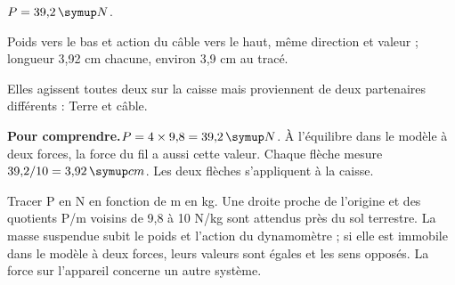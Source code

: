 \par\noindent\begin{minipage}{\linewidth}
\label{cor-defi-9}\begin{questions}
\item $P=39{,}2\unite N$.
\item Poids vers le bas et action du câble vers le haut, même direction et valeur ; longueur 3,92 cm chacune, environ 3,9 cm au tracé.
\item Elles agissent toutes deux sur la caisse mais proviennent de deux partenaires différents : Terre et câble.
\end{questions}
\par\smallskip\noindent\textbf{Pour comprendre.}\enspace $P=4\times9{,}8=39{,}2\unite N$. À l’équilibre dans le modèle à deux forces, la force du fil a aussi cette valeur. Chaque flèche mesure $39{,}2/10=3{,}92\unite{cm}$. Les deux flèches s’appliquent à la caisse.\par
{}
\end{minipage}
\par\noindent\begin{minipage}{\linewidth}
\label{cor-activite-9}
Tracer P en N en fonction de m en kg. Une droite proche de l’origine et des quotients P/m voisins de 9,8 à 10 N/kg sont attendus près du sol terrestre. La masse suspendue subit le poids et l’action du dynamomètre ; si elle est immobile dans le modèle à deux forces, leurs valeurs sont égales et les sens opposés. La force sur l’appareil concerne un autre système.\par\end{minipage}

